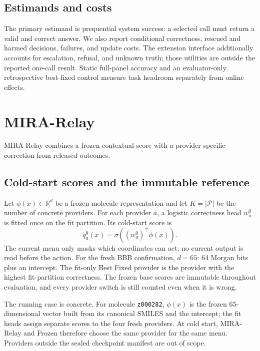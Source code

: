 \documentclass[sigconf,anonymous]{aamas}
\begin{document}
\subsection{Estimands and costs}
The primary estimand is prequential system success: a selected call must return a valid and correct answer. We also report conditional correctness, rescued and harmed decisions, failures, and update costs. The extension interface additionally accounts for escalation, refusal, and unknown truth; those utilities are outside the reported one-call result. Static full-panel accuracy and an evaluator-only retrospective best-fixed control measure task headroom separately from online effects.

\section{MIRA-Relay}
MIRA-Relay combines a frozen contextual score with a provider-specific correction from released outcomes.

\subsection{Cold-start scores and the immutable reference}
Let $\phi(x)\in\mathbb{R}^{d}$ be a frozen molecule representation and let $K=|\mathcal P|$ be the number of concrete providers. For each provider $a$, a logistic correctness head $w_a^0$ is fitted once on the fit partition. Its cold-start score is
$$
q_a^0(x)=\sigma\!\left((w_a^0)^\top\phi(x)\right).
$$
The current menu only masks which coordinates can act; no current output is read before the action. For the fresh BBB confirmation, $d=65$: 64 Morgan bits plus an intercept. The fit-only Best Fixed provider is the provider with the highest fit-partition correctness. The frozen base scores are immutable throughout evaluation, and every provider switch is still counted even when it is wrong.

The running case is concrete. For molecule \texttt{z000282}, $\phi(x)$ is the frozen 65-dimensional vector built from its canonical SMILES and the intercept; the fit heads assign separate scores to the four fresh providers. At cold start, MIRA-Relay and Frozen therefore choose the same provider for the same menu. Providers outside the sealed checkpoint manifest are out of scope.
\end{document}
